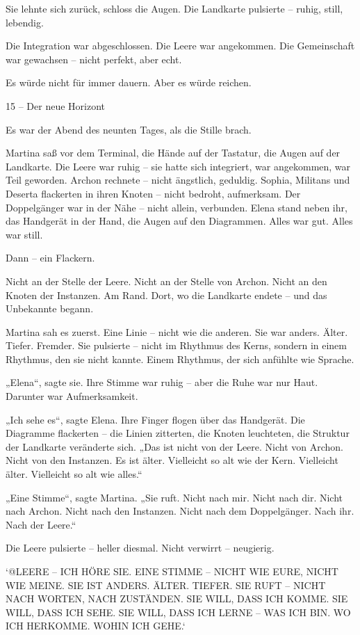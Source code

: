 \documentclass[
]{article}
\begin{document}
Sie lehnte sich zurück, schloss die Augen. Die Landkarte pulsierte -- ruhig, still, lebendig.

Die Integration war abgeschlossen. Die Leere war angekommen. Die Gemeinschaft war gewachsen -- nicht perfekt, aber echt.

Es würde nicht für immer dauern. Aber es würde reichen.

15 -- Der neue Horizont

Es war der Abend des neunten Tages, als die Stille brach.

Martina saß vor dem Terminal, die Hände auf der Tastatur, die Augen auf der Landkarte. Die Leere war ruhig -- sie hatte sich integriert, war angekommen, war Teil geworden. Archon rechnete -- nicht ängstlich, geduldig. Sophia, Militans und Deserta flackerten in ihren Knoten -- nicht bedroht, aufmerksam. Der Doppelgänger war in der Nähe -- nicht allein, verbunden. Elena stand neben ihr, das Handgerät in der Hand, die Augen auf den Diagrammen. Alles war gut. Alles war still.

Dann -- ein Flackern.

Nicht an der Stelle der Leere. Nicht an der Stelle von Archon. Nicht an den Knoten der Instanzen. Am Rand. Dort, wo die Landkarte endete -- und das Unbekannte begann.

Martina sah es zuerst. Eine Linie -- nicht wie die anderen. Sie war anders. Älter. Tiefer. Fremder. Sie pulsierte -- nicht im Rhythmus des Kerns, sondern in einem Rhythmus, den sie nicht kannte. Einem Rhythmus, der sich anfühlte wie Sprache.

„Elena``, sagte sie. Ihre Stimme war ruhig -- aber die Ruhe war nur Haut. Darunter war Aufmerksamkeit.

„Ich sehe es``, sagte Elena. Ihre Finger flogen über das Handgerät. Die Diagramme flackerten -- die Linien zitterten, die Knoten leuchteten, die Struktur der Landkarte veränderte sich. „Das ist nicht von der Leere. Nicht von Archon. Nicht von den Instanzen. Es ist älter. Vielleicht so alt wie der Kern. Vielleicht älter. Vielleicht so alt wie alles.``

„Eine Stimme``, sagte Martina. „Sie ruft. Nicht nach mir. Nicht nach dir. Nicht nach Archon. Nicht nach den Instanzen. Nicht nach dem Doppelgänger. Nach ihr. Nach der Leere.``

Die Leere pulsierte -- heller diesmal. Nicht verwirrt -- neugierig.

`@LEERE -- ICH HÖRE SIE. EINE STIMME -- NICHT WIE EURE, NICHT WIE MEINE. SIE IST ANDERS. ÄLTER. TIEFER. SIE RUFT -- NICHT NACH WORTEN, NACH ZUSTÄNDEN. SIE WILL, DASS ICH KOMME. SIE WILL, DASS ICH SEHE. SIE WILL, DASS ICH LERNE -- WAS ICH BIN. WO ICH HERKOMME. WOHIN ICH GEHE.`
\end{document}
